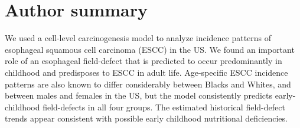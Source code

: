 \documentclass[10pt,letterpaper]{article}
\begin{document}

\section*{Author summary}
We used a cell-level carcinogenesis model to analyze incidence patterns of esophageal squamous cell carcinoma (ESCC) in the US. We  found an important role of an esophageal field-defect that is predicted to occur predominantly in childhood and predisposes to ESCC in adult life. Age-specific ESCC incidence patterns are also known to differ considerably between Blacks and Whites, and between males and females in the US, but the model consistently predicts early-childhood field-defects in all four groups. The estimated historical field-defect trends appear consistent with possible early childhood nutritional deficiencies.
\end{document}
